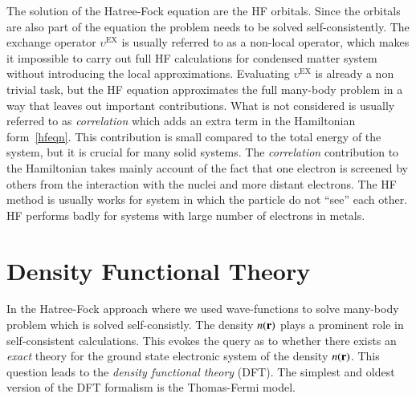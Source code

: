 The solution of the Hatree-Fock equation are the HF orbitals. Since the orbitals are also part of the equation the problem needs to be solved self-consistently. The exchange operator $\upsilon^{\text{EX}}$ is usually referred to as a non-local operator, which makes it impossible to carry out full HF calculations for condensed matter system without introducing the local approximations. Evaluating $\upsilon^{\text{EX}}$ is already a non trivial task, but the HF equation approximates the full many-body problem in a way that leaves out important contributions. What is not considered is usually referred to as \textit{correlation} which adds an extra term in the Hamiltonian form~\eqref{hfeqn}. This contribution is small compared to the total energy of the system, but it is crucial for many solid systems. The \textit{correlation} contribution to the Hamiltonian takes mainly account of the fact that one electron is screened by others from the interaction with the nuclei and more distant electrons. The HF method is usually works for system in which the particle do not ``see'' each other. HF performs badly for systems with large number of electrons in metals.




\section{Density Functional Theory}
In the Hatree-Fock approach where we used wave-functions to solve many-body problem which is solved self-consistly. The density $n(\vb{r})$ plays a prominent role in self-consistent calculations. This evokes the query as to whether there exists an \textit{exact} theory for the ground state electronic system of the density $n(\vb{r})$. This question leads to the \textit{density functional \mbox{theory}} (DFT). The simplest and oldest version of the DFT formalism is the Thomas-Fermi model\cite{thomas1927calculation,fermi1927metodo}.

